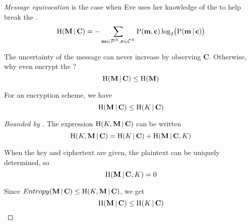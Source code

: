 \begin{definition}\label{def:Message_Equivocation}
  \emph{Message equivocation} is the case when Eve uses her knowledge of the  to help break the .
  \begin{equation}\label{eq:Message_Equivocation}
    \operatorname{\operatorname{H}}(\mathbf{M} \operatorname{\vert} \mathbf{C}) = - \sum\limits_{\mathbf{m} \in \operatorname{\mathcal{P}}^{N}, \mathbf{c} \in \operatorname{\mathcal{C}}^{N}} \operatorname{\operatorname{P}}(\mathbf{m}, \mathbf{c}) \log_{2} \bigl( \operatorname{\operatorname{P}}(\mathbf{m} \operatorname{\vert} \mathbf{c}) \bigr)
  \end{equation}

  \begin{remark}\label{def:Message_Equivocation_Upper_Bound}
    The uncertainty of the message can never increase by observing $\mathbf{C}$.
    Otherwise, why even encrypt the ?
    \begin{equation}\label{eq:Message_Equivocation_Upper_Bound}
      \operatorname{\operatorname{H}}(\mathbf{M} \operatorname{\vert} \mathbf{C}) \leq \operatorname{\operatorname{H}}(\mathbf{M})
    \end{equation}
  \end{remark}
\end{definition}

\begin{theorem}\label{thm:Message_Equivocation_Bounded_Key_Equivocation}
  For an encryption scheme, we have
  \begin{equation}\label{eq:Message_Equivocation_Bounded_Key_Equivocation}
    \operatorname{\operatorname{H}}(\mathbf{M} \operatorname{\vert} \mathbf{C}) \leq \operatorname{\operatorname{H}}(K \operatorname{\vert} \mathbf{C})
  \end{equation}
\end{theorem}

\begin{proof}[ Bounded by ]\label{proof:Message_Equivocation_Bounded_Key_Equivocation}
  The expression $\operatorname{\operatorname{H}}(K, \mathbf{M} \operatorname{\vert} \mathbf{C})$ can be written
  \begin{equation*}
    \operatorname{\operatorname{H}}(K, \mathbf{M} \operatorname{\vert} \mathbf{C}) = \operatorname{\operatorname{H}}(K \operatorname{\vert} \mathbf{C}) + \operatorname{\operatorname{H}}(\mathbf{M} \operatorname{\vert} \mathbf{C}, K)
  \end{equation*}

  When the key and ciphertext are given, the plaintext can be uniquely determined, so
  \begin{equation*}
    \operatorname{\operatorname{H}}(\mathbf{M} \operatorname{\vert} \mathbf{C}, K) = 0
  \end{equation*}

  Since $Entropy(\mathbf{M} \operatorname{\vert} \mathbf{C}) \leq \operatorname{\operatorname{H}}(K, \mathbf{M} \operatorname{\vert} \mathbf{C})$, we get
  \begin{equation*}
    \operatorname{\operatorname{H}}(\mathbf{M} \operatorname{\vert} \mathbf{C}) \leq \operatorname{\operatorname{H}}(K \operatorname{\vert} \mathbf{C})
  \end{equation*}
\end{proof}

